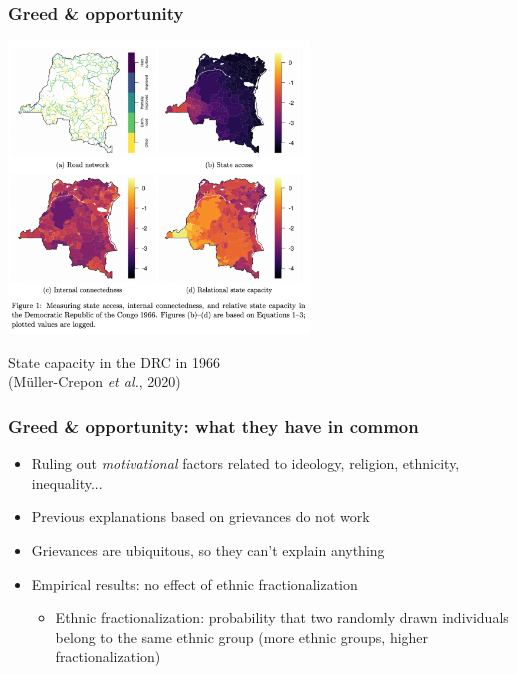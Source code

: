 \documentclass[utf8, xcolor=dvipsnames]{beamer}
\begin{document}
\begin{frame}
\frametitle{Greed \& opportunity}
\centering

\includegraphics[width = 0.6\textwidth]{img/muller-crepon}

State capacity in the DRC in 1966\\
{\small (Müller-Crepon \textit{et al.}, 2020)}

\end{frame}

\begin{frame}
\frametitle{Greed \& opportunity: what they have in common}
\centering

\begin{itemize}[<+->]
  \item Ruling out \textit{motivational} factors related to ideology, religion, ethnicity, inequality...
  \item Previous explanations based on grievances do not work
  \item Grievances are ubiquitous, so they can't explain anything
  \item Empirical results: no effect of ethnic fractionalization
  \begin{itemize}
    \item Ethnic fractionalization: probability that two randomly drawn individuals belong to the same ethnic group (more ethnic groups, higher fractionalization)
  \end{itemize}
\end{itemize}

\end{frame}
\end{document}
